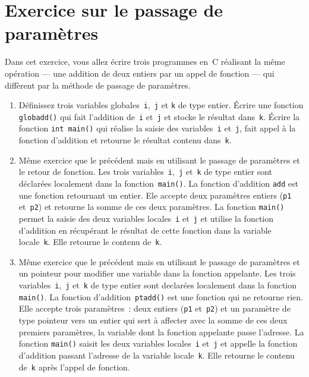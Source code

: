 \section{Exercice sur le passage de param\`etres}
Dans   cet  exercice,   vous allez   \'ecrire  trois programmes   en~C
r\'ealisant la m\^eme op\'eration --- une addition de deux entiers par
un appel  de fonction --- qui  diff\`erent par la m\'ethode de passage
de param\`etres.
\begin{enumerate}
\item D\'efinissez   trois variables globales~\texttt{i},~\texttt{j} et
  \texttt{k} de type entier.  \'Ecrire une fonction \texttt{globadd()}
  qui   fait  l'addition de~\texttt{i}   et~\texttt{j}  et   stocke le
  r\'esultat dans~\texttt{k}.   \'Ecrire la   fonction \texttt{int main()}
  qui r\'ealise la saisie des variables~\texttt{i} et~\texttt{j}, fait
  appel \`a la  fonction  d'addition et retourne le  r\'esultat contenu
  dans~\texttt{k}.
\item   M\^eme exercice que  le  pr\'ec\'edent   mais en utilisant  le
  passage de param\`etres  et   le retour   de fonction.   Les   trois
  variables~\texttt{i},~\texttt{j} et~\texttt{k}  de  type entier sont
  d\'eclar\'ees   localement dans   la  fonction~\texttt{main()}.   La
  fonction d'addition \verb+add+ est une   fonction  retournant un entier.    Ele
  accepte deux  param\`etres entiers (\texttt{p1}  et~\texttt{p2})  et
  retourne    la somme de     ces   deux param\`etres.  La    fonction
  \texttt{main()}     permet    la   saisie     des    deux  variables
  locales~\texttt{i}  et~\texttt{j} et  utilise la fonction d'addition
  en r\'ecup\'erant le r\'esultat de  cette fonction dans la  variable
  locale~\texttt{k}.   Elle  retourne le contenu  de~\texttt{k}.
\item  M\^eme  exercice  que le  pr\'ec\'edent   mais en utilisant  le
  passage de param\`etres  et  un pointeur pour modifier  une variable
  dans         la      fonction      appelante.      Les         trois
  variables~\texttt{i},~\texttt{j} et~\texttt{k}   de type entier sont
  declar\'ees   localement dans    la   fonction \texttt{main()}.   La
  fonction d'addition~\texttt{ptadd()}    est   une fonction  qui   ne
  retourne  rien.   Elle  accepte   trois  param\`etres~: deux entiers
  (\texttt{p1} et~\texttt{p2}) et un param\`etre de type pointeur vers
  un entier qui sert  \`a affecter avec  la somme de ces deux premiers
  param\`etres,   la variable   dont    la fonction   appelante  passe
  l'adresse.  La  fonction \texttt{main()}  saisit  les deux variables
  locales~\texttt{i} et~\texttt{j}  et  appelle  la fonction d'addition
  passant l'adresse de la variable  locale~\texttt{k}. Elle retourne le
  contenu de~\texttt{k} apr\`es l'appel de fonction.
\end{enumerate}
